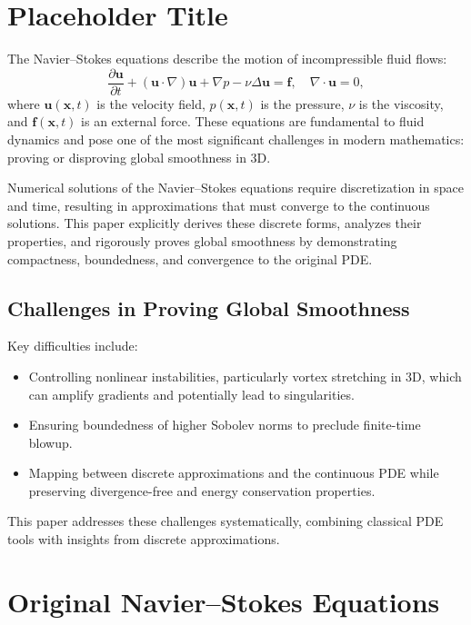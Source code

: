 \section{Placeholder Title}

The Navier--Stokes equations describe the motion of incompressible fluid flows:
\begin{equation}
\frac{\partial \mathbf{u}}{\partial t} + (\mathbf{u} \cdot \nabla) \mathbf{u} + \nabla p - \nu \Delta \mathbf{u} = \mathbf{f}, \quad \nabla \cdot \mathbf{u} = 0,
\end{equation}
where $\mathbf{u}(\mathbf{x}, t)$ is the velocity field, $p(\mathbf{x}, t)$ is the pressure, $\nu$ is the viscosity, and $\mathbf{f}(\mathbf{x}, t)$ is an external force. These equations are fundamental to fluid dynamics and pose one of the most significant challenges in modern mathematics: proving or disproving global smoothness in 3D.

Numerical solutions of the Navier--Stokes equations require discretization in space and time, resulting in approximations that must converge to the continuous solutions. This paper explicitly derives these discrete forms, analyzes their properties, and rigorously proves global smoothness by demonstrating compactness, boundedness, and convergence to the original PDE.

\subsection{Challenges in Proving Global Smoothness}
Key difficulties include:
\begin{itemize}
    \item Controlling nonlinear instabilities, particularly vortex stretching in 3D, which can amplify gradients and potentially lead to singularities.
    \item Ensuring boundedness of higher Sobolev norms to preclude finite-time blowup.
    \item Mapping between discrete approximations and the continuous PDE while preserving divergence-free and energy conservation properties.
\end{itemize}

This paper addresses these challenges systematically, combining classical PDE tools with insights from discrete approximations.

\section{Original Navier--Stokes Equations}

